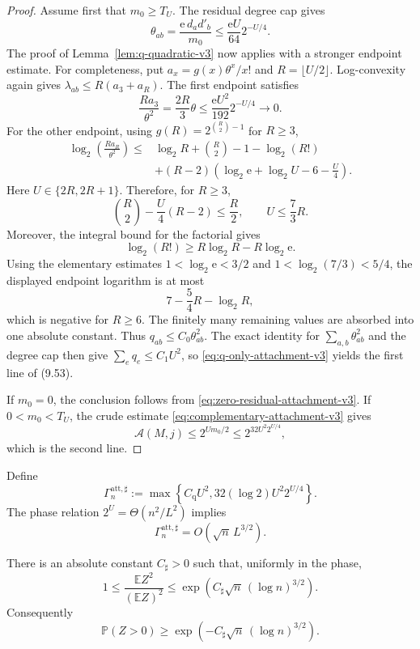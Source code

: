 \begin{proof}
Assume first that $m_0\ge T_U$.  The residual degree cap gives
\[
  \theta_{ab}
  =\frac{\mathrm e\,d_ad'_b}{m_0}
  \le \frac{\mathrm e U}{64}2^{-U/4}.
\]
The proof of Lemma~\ref{lem:q-quadratic-v3} now applies with a stronger
endpoint estimate.  For completeness, put
$a_x=g(x)\theta^x/x!$ and $R=\lfloor U/2\rfloor$.  Log-convexity again gives
$\lambda_{ab}\le R(a_3+a_R)$.  The first endpoint satisfies
\[
  \frac{Ra_3}{\theta^2}
  =\frac{2R}{3}\theta
  \le \frac{\mathrm e U^2}{192}2^{-U/4}
  \longrightarrow0.
\]
For the other endpoint, using $g(R)=2^{\binom R2-1}$ for $R\ge3$,
\[
\begin{aligned}
  \log_2\!\left(\frac{Ra_R}{\theta^2}\right)
  \le{}&
  \log_2R+\binom R2-1-\log_2(R!)\\
  &+(R-2)\left(
    \log_2\mathrm e+\log_2U-6-\frac U4
  \right).
\end{aligned}
\]
Here $U\in\{2R,2R+1\}$.  Therefore, for $R\ge3$,
\[
  \binom R2-\frac U4(R-2)\le\frac R2,
  \qquad
  U\le\frac73R.
\]
Moreover, the integral bound for the factorial gives
\[
  \log_2(R!)
  \ge R\log_2R-R\log_2\mathrm e.
\]
Using the elementary estimates
$1<\log_2\mathrm e<3/2$ and
$1<\log_2(7/3)<5/4$, the displayed endpoint logarithm is at most
\[
  7-\frac54R-\log_2R,
\]
which is negative for $R\ge6$.  The finitely many remaining values are
absorbed into one absolute constant.
Thus $q_{ab}\le C_0\theta_{ab}^2$.  The exact identity for
$\sum_{a,b}\theta_{ab}^2$ and the degree cap then give
$\sum_e q_e\le C_1U^2$, so \eqref{eq:q-only-attachment-v3} yields the first
line of (9.53).

If $m_0=0$, the conclusion follows from
\eqref{eq:zero-residual-attachment-v3}.  If $0<m_0<T_U$, the crude estimate
\eqref{eq:complementary-attachment-v3} gives
\[
  \mathcal A(M,j)
  \le2^{Um_0/2}
  \le2^{32U^2 2^{U/4}},
\]
which is the second line.
\end{proof}

Define
\begin{equation*}
  \Gamma_n^{\mathrm{att},\sharp}
  :=
  \max\!\left\{
    C_\mathrm{q}U^2,
    32(\log 2)U^2 2^{U/4}
  \right\}.
  \tag{9.54}
\end{equation*}
The phase relation $2^U=\Theta(n^2/L^2)$ implies
\begin{equation*}
  \Gamma_n^{\mathrm{att},\sharp}
  =O\!\left(\sqrt n\,L^{3/2}\right).
  \tag{9.55}
\end{equation*}

\begin{corollary}
\label{cor:sharpened-seed-exponent-v4}
There is an absolute constant $C_\sharp>0$ such that, uniformly in the phase,
\begin{equation*}
  1
  \le
  \frac{\mathbb E Z^2}{(\mathbb E Z)^2}
  \le
  \exp\!\left(C_\sharp\sqrt n\,(\log n)^{3/2}\right).
  \tag{9.56}
\end{equation*}
Consequently
\begin{equation*}
  \mathbb P(Z>0)
  \ge
  \exp\!\left(-C_\sharp\sqrt n\,(\log n)^{3/2}\right).
  \tag{9.57}
\end{equation*}
\end{corollary}

